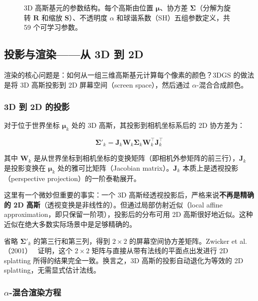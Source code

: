\begin{figure}[htbp]
\centering
\resizebox{0.7\textwidth}{!}{}
\caption{3D 高斯基元的参数结构。每个高斯由位置 $\boldsymbol{\mu}$、协方差 $\boldsymbol{\Sigma}$（分解为旋转 $\mathbf{R}$ 和缩放 $\mathbf{S}$）、不透明度 $\alpha$ 和球谐系数（SH）五组参数定义，共 59 个可学习参数。}
\label{fig:01_gaussian_params}
\end{figure}

\subsection{投影与渲染——从 3D 到 2D}
\label{sec:01_1_2}

渲染的核心问题是：如何从一组三维高斯基元计算每个像素的颜色？3DGS 的做法是将 3D 高斯投影到 2D 屏幕空间（screen space），然后通过 $\alpha$-混合合成颜色。

\subsubsection{3D 到 2D 的投影}

对于位于世界坐标 $\boldsymbol{\mu}_k$ 处的 3D 高斯，其投影到相机坐标系后的 2D 协方差为：

\begin{equation}
\label{eq:projection}
\boldsymbol{\Sigma}'_k = \mathbf{J}_k \mathbf{W}_k \boldsymbol{\Sigma}_k \mathbf{W}_k^\top \mathbf{J}_k^\top
\end{equation}

其中 $\mathbf{W}_k$ 是从世界坐标到相机坐标的变换矩阵（即相机外参矩阵的前三行），$\mathbf{J}_k$ 是投影变换在 $\boldsymbol{\mu}_k$ 处的雅可比矩阵（Jacobian matrix）。$\mathbf{J}_k$ 本质上是透视投影（perspective projection）的一阶泰勒展开。

这里有一个微妙但重要的事实：一个 3D 高斯经透视投影后，严格来说\textbf{不再是精确的 2D 高斯}（透视变换是非线性的）。但通过局部仿射近似（local affine approximation，即只保留一阶项），投影后的分布可用 2D 高斯很好地近似。这种近似在绝大多数实际场景中是足够精确的。

省略 $\boldsymbol{\Sigma}'_k$ 的第三行和第三列，得到 $2 \times 2$ 的屏幕空间协方差矩阵。Zwicker et al.（2001）~\cite{zwicker2001ewa} 证明，这个 $2 \times 2$ 矩阵与直接从带有法线的平面点出发进行 2D splatting 所得的结果完全一致。换言之，3D 高斯的投影自动退化为等效的 2D splatting，无需显式估计法线。

\subsubsection{$\alpha$-混合渲染方程}

